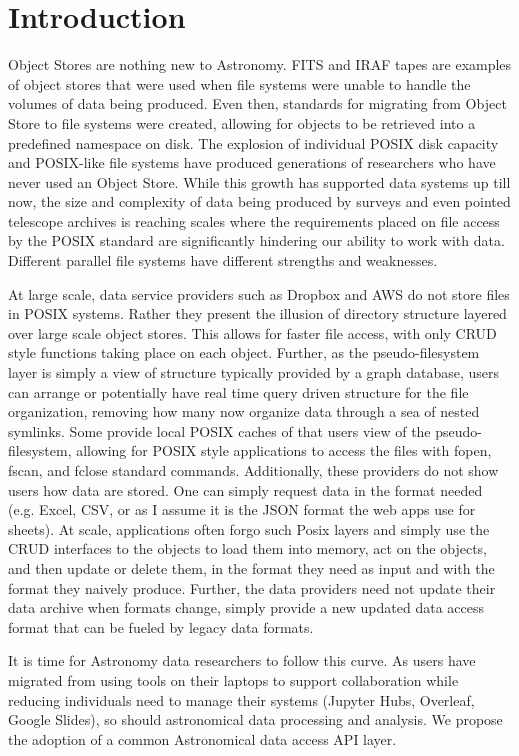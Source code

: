 \section{Introduction} \label{sec:intro}

Object Stores are nothing new to Astronomy.  FITS and IRAF tapes are examples
of object stores that were used when file systems were unable to handle the volumes
of data being produced. Even then, standards for migrating from Object Store to file
systems were created, allowing for objects to be retrieved into a predefined namespace
on disk.  The explosion of individual POSIX disk capacity and POSIX-like file systems
have produced generations of researchers who have never used an Object Store. While
this growth has supported data systems up till now, the size and complexity of
data being produced by surveys and even pointed telescope archives is reaching
scales where the requirements placed on file access by the POSIX standard are
significantly hindering our ability to work with data.  Different parallel file systems
have different strengths and weaknesses.

At large scale, data service providers such as Dropbox and AWS do not store files
in POSIX systems.  Rather they present the illusion of directory structure layered over
large scale object stores. This allows for faster file access, with only CRUD style
functions taking place on each object.  Further, as the pseudo-filesystem layer is simply a
view of structure typically provided by a graph database, users can arrange or potentially
have real time query driven structure for the file organization, removing how many now
organize data through a sea of nested symlinks.
Some provide local POSIX caches of that users view of the
pseudo-filesystem, allowing for POSIX style applications to access the files with
fopen, fscan, and fclose standard commands. Additionally, these providers do
not show users how data are stored. One can simply request data in the format
needed (e.g. Excel, CSV, or as I assume it is the JSON format the web apps
use for sheets).   At scale, applications often forgo
such Posix layers and simply use the CRUD interfaces to the objects to load them into
memory, act on the objects, and then update or delete them, in the format they need
as input and with the format they naively produce. Further, the data providers need
not update their data archive when formats change, simply provide a new updated
data access format that can be fueled by legacy data formats.

It is time for Astronomy data researchers to follow this curve. As users have migrated
from using tools on their laptops to support collaboration while reducing
individuals need to manage their systems (Jupyter Hubs, Overleaf, Google Slides),
so should astronomical data processing and analysis. We propose the adoption of
a common Astronomical data access API layer.



